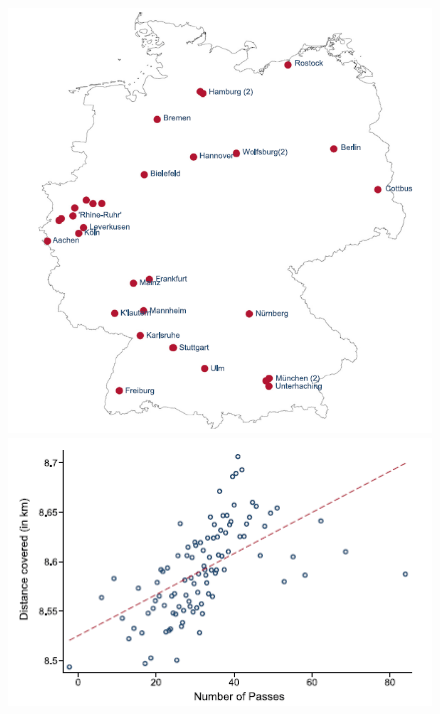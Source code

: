\documentclass[../root]{subfiles}
\begin{document}
    \begin{figure}[H]
      \centering
      \includegraphics[scale = .7]{0522tanji/f1}
      \includegraphics[scale = 1]{0522tanji/fa1}
      \label{f1}
    \end{figure}
\end{document}
